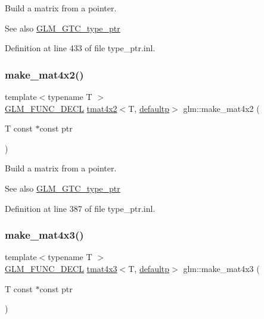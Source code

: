 Build a matrix from a pointer. \begin{DoxySeeAlso}{See also}
\mbox{\hyperlink{group__gtc__type__ptr}{G\+L\+M\+\_\+\+G\+T\+C\+\_\+type\+\_\+ptr}} 
\end{DoxySeeAlso}


Definition at line 433 of file type\+\_\+ptr.\+inl.

\mbox{\label{group__gtc__type__ptr_ga967a5b934e67ff9a6d1d0d27a377a264}} 
\subsubsection{\texorpdfstring{make\_mat4x2()}{make\_mat4x2()}}
{\footnotesize\ttfamily template$<$typename T $>$ \\
\mbox{\hyperlink{setup_8hpp_ab2d052de21a70539923e9bcbf6e83a51}{G\+L\+M\+\_\+\+F\+U\+N\+C\+\_\+\+D\+E\+CL}} \mbox{\hyperlink{structglm_1_1tmat4x2}{tmat4x2}}$<$T, \mbox{\hyperlink{namespaceglm_a0f04f086094c747d227af4425893f545a9d21ccd8b5a009ec7eb7677befc3bf51}{defaultp}}$>$ glm\+::make\+\_\+mat4x2 (\begin{DoxyParamCaption}\item[{T const $\ast$const}]{ptr }\end{DoxyParamCaption})}

Build a matrix from a pointer. \begin{DoxySeeAlso}{See also}
\mbox{\hyperlink{group__gtc__type__ptr}{G\+L\+M\+\_\+\+G\+T\+C\+\_\+type\+\_\+ptr}} 
\end{DoxySeeAlso}


Definition at line 387 of file type\+\_\+ptr.\+inl.

\mbox{\label{group__gtc__type__ptr_ga4d42daced532b33cc672280e48670a51}} 
\subsubsection{\texorpdfstring{make\_mat4x3()}{make\_mat4x3()}}
{\footnotesize\ttfamily template$<$typename T $>$ \\
\mbox{\hyperlink{setup_8hpp_ab2d052de21a70539923e9bcbf6e83a51}{G\+L\+M\+\_\+\+F\+U\+N\+C\+\_\+\+D\+E\+CL}} \mbox{\hyperlink{structglm_1_1tmat4x3}{tmat4x3}}$<$T, \mbox{\hyperlink{namespaceglm_a0f04f086094c747d227af4425893f545a9d21ccd8b5a009ec7eb7677befc3bf51}{defaultp}}$>$ glm\+::make\+\_\+mat4x3 (\begin{DoxyParamCaption}\item[{T const $\ast$const}]{ptr }\end{DoxyParamCaption})}


